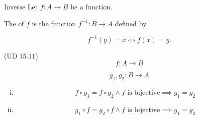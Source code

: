 \begin{frame}{}
  \begin{definition}{Inverse}
    Let $f: A \to B$ be a  function.

    The  of $f$ is the function $f^{-1}: B \to A$ defined by

    \[
      f^{-1}(y) = x \iff f(x) = y.
    \]
  \end{definition}
\end{frame}

\begin{frame}{}
  \begin{exampleblock}{(UD $15.11$)}
    \[
      f: A \to B
    \]

    \[
      g_1, g_2: B \to A
    \]

    \begin{enumerate}[(i)]
      \item 
	\[
	  f \circ g_1 = f \circ g_2 \land f \text{ is bijective} \implies g_1 = g_2
	\]
      \item 
	\[
	  g_1 \circ f = g_2 \circ f \land f \text{ is bijective} \implies g_1 = g_2
	\]
    \end{enumerate}
  \end{exampleblock}
\end{frame}
